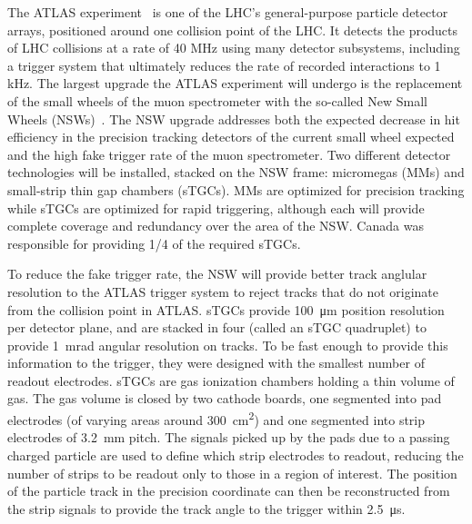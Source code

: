 The ATLAS experiment~\cite{collaboration_atlas_2008} is one of the LHC's general-purpose particle detector arrays, positioned around one collision point of the LHC. It detects the products of LHC collisions at a rate of 40 MHz using many detector subsystems, including a trigger system that ultimately reduces the rate of recorded interactions to 1 kHz. The largest upgrade the ATLAS experiment will undergo is the replacement of the small wheels of the muon spectrometer with the so-called New Small Wheels (NSWs)~\cite{nsw_tdr}. The NSW upgrade addresses both the expected decrease in hit efficiency in the precision tracking detectors of the current small wheel expected and the high fake trigger rate of the muon spectrometer. Two different detector technologies will be installed, stacked on the NSW frame: micromegas (MMs) and small-strip thin gap chambers (sTGCs). MMs are optimized for precision tracking while sTGCs are optimized for rapid triggering, although each will provide complete coverage and redundancy over the area of the NSW. Canada was responsible for providing 1/4 of the required sTGCs.

To reduce the fake trigger rate, the NSW will provide better track anglular resolution to the ATLAS trigger system to reject tracks that do not originate from the collision point in ATLAS. sTGCs provide \SI{100}{\micro\meter} position resolution per detector plane, and are stacked in four (called an sTGC quadruplet) to provide \SI{1}{mrad} angular resolution on tracks. To be fast enough to provide this information to the trigger, they were designed with the smallest number of readout electrodes. sTGCs are gas ionization chambers holding a thin volume of gas. The gas volume is closed by two cathode boards, one segmented into pad electrodes (of varying areas around \SI{300}{\centi\meter\squared}) and one segmented into strip electrodes of \SI{3.2}{mm} pitch. The signals picked up by the pads due to a passing charged particle are used to define which strip electrodes to readout, reducing the number of strips to be readout only to those in a region of interest. The position of the particle track in the precision coordinate can then be reconstructed from the strip signals to provide the track angle to the trigger within \SI{2.5}{\micro\second}.


